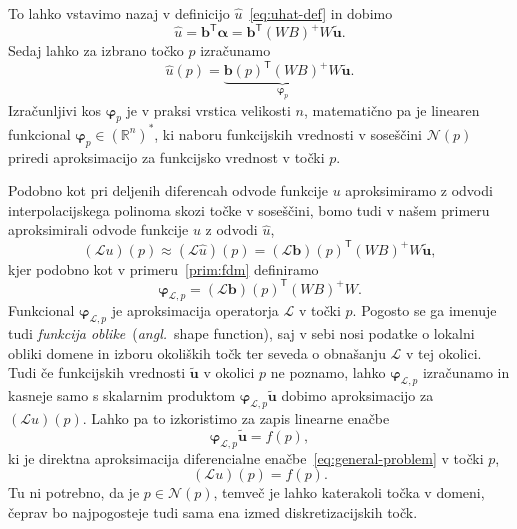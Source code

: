 \documentclass[12pt,a4paper,twoside]{article}
\theoremstyle{definition} %
\theoremstyle{plain} %
\numberwithin{equation}{section}
\newcommand{\R}{\mathbb R}
\newcommand{\Nc}{\mathcal{N}}
\renewcommand{\L}{\mathcal{L}}
\newcommand{\T}{\mathsf{T}}
\renewcommand{\b}{\boldsymbol}
\renewcommand{\phi}{\varphi}
\newcommand{\uh}{\hat{u}}
\newcommand{\ang}[1]{(\hspace{-1.5px}\textit{angl.}\ #1)}
\begin{document}
To lahko vstavimo nazaj v definicijo $\hat{u}$~\eqref{eq:uhat-def} in dobimo
\begin{equation}
  \hat{u} = \b{b}^\T\b{\alpha} = \b{b}^\T(WB)^{+}W\b{\tilde{u}}.
\end{equation}
Sedaj lahko za izbrano točko $p$ izračunamo
\begin{equation}
   \hat{u}(p) = \underbrace{\b{b}(p)^\T(WB)^{+}W}_{\b\phi_p}\b{\tilde{u}}.
\end{equation}
Izračunljivi kos $\b\phi_p$ je v praksi vrstica velikosti $n$, matematično pa je
linearen funkcional $\b\phi_p \in (\R^n)^\ast$, ki naboru funkcijskih vrednosti v
soseščini $\Nc(p)$ priredi aproksimacijo za funkcijsko vrednost v točki $p$.

Podobno kot pri deljenih diferencah odvode funkcije $u$ aproksimiramo z odvodi
interpolacijskega polinoma skozi točke v soseščini, bomo tudi v našem primeru
aproksimirali odvode funkcije $u$ z odvodi $\uh$,
\begin{equation}
  (\L u)(p) \approx (\L \uh)(p) = (\L\b{b})(p)^\T(WB)^{+}W \b{\tilde{u}},
\end{equation}
kjer podobno kot v primeru~\ref{prim:fdm} definiramo
\begin{equation}
  \b\phi_{\L, p} = (\L\b{b})(p)^\T(WB)^{+}W.
  \label{eq:shape-definition}
\end{equation}
Funkcional $\b\phi_{\L, p}$ je aproksimacija operatorja $\L$ v točki $p$. Pogosto se ga imenuje
tudi \emph{funkcija oblike}~\ang{shape function}, saj v sebi nosi podatke o lokalni obliki domene in
izboru okoliških točk ter seveda o obnašanju $\L$ v tej okolici. Tudi če funkcijskih vrednosti
$\b{\tilde{u}}$ v okolici $p$ ne poznamo, lahko $\b\phi_{\L, p}$ izračunamo in kasneje samo s
skalarnim produktom $\b\phi_{\L, p} \b{\tilde{u}}$ dobimo aproksimacijo za $(\L u)(p)$. Lahko pa to
izkoristimo za zapis linearne enačbe
\begin{equation}
  \b\phi_{\L, p} \b{\tilde{u}} = f(p),
\end{equation}
ki je direktna aproksimacija diferencialne
enačbe~\eqref{eq:general-problem} v točki $p$,
\begin{equation}
  \label{eq:discrete-approx-in-one-point}
   (\L u)(p) = f(p).
\end{equation}
Tu ni potrebno, da je $p \in \Nc(p)$, temveč je lahko katerakoli točka v domeni, čeprav bo
najpogosteje tudi sama ena izmed diskretizacijskih točk.
\end{document}
